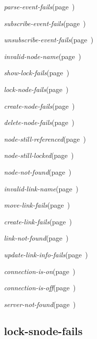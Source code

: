 \begin{description}
\item {\sl parse-event-fails}\hfill(page~\pageref{parse-event-fails})
\item {\sl subscribe-event-fails}\hfill(page~\pageref{subscribe-event-fails})
\item {\sl unsubscribe-event-fails}\hfill(page~\pageref{unsubscribe-event-fails})

\item {\sl invalid-node-name}\hfill(page~\pageref{invalid-node-name})
\item {\sl show-lock-fails}\hfill(page~\pageref{show-lock-fails})
\item {\sl lock-node-fails}\hfill(page~\pageref{lock-node-fails})
\item {\sl create-node-fails}\hfill(page~\pageref{create-node-fails})
\item {\sl delete-node-fails}\hfill(page~\pageref{delete-node-fails})
\item {\sl node-still-referenced}\hfill(page~\pageref{node-still-referenced})
\item {\sl node-still-locked}\hfill(page~\pageref{node-still-locked})
\item {\sl node-not-found}\hfill(page~\pageref{node-not-found})

\item {\sl invalid-link-name}\hfill(page~\pageref{invalid-link-name})
\item {\sl move-link-fails}\hfill(page~\pageref{move-link-fails})
\item {\sl create-link-fails}\hfill(page~\pageref{create-link-fails})
\item {\sl link-not-found}\hfill(page~\pageref{link-not-found})
\item {\sl update-link-info-fails}\hfill(page~\pageref{update-link-info-fails})

\item {\sl connection-is-on}\hfill(page~\pageref{connection-is-on})
\item {\sl connection-is-off}\hfill(page~\pageref{connection-is-off})
\item {\sl server-not-found}\hfill(page~\pageref{server-not-found})









\end{description}
\horizontalline

\subsection{lock-snode-fails}
\label{lock-snode-fails}


